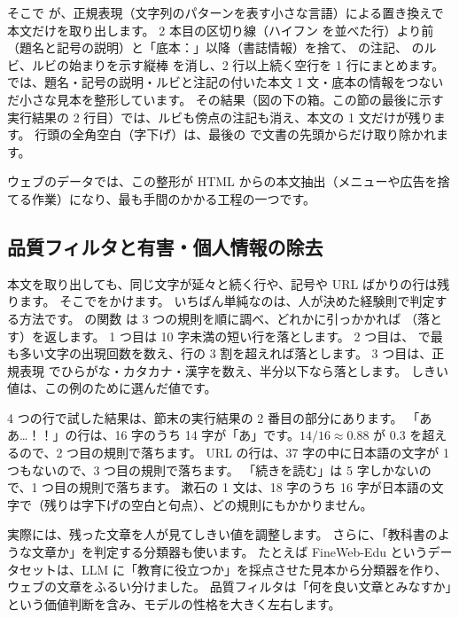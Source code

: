 そこで  が、正規表現（文字列のパターンを表す小さな言語）による置き換えで本文だけを取り出します。
2 本目の区切り線（ハイフン \code{-} を並べた行）より前（題名と記号の説明）と「底本：」以降（書誌情報）を捨て、
 の注記、 のルビ、ルビの始まりを示す縦棒  を消し、2 行以上続く空行を 1 行にまとめます。
 では、題名・記号の説明・ルビと注記の付いた本文 1 文・底本の情報をつないだ小さな見本を整形しています。
その結果（図の下の箱。この節の最後に示す実行結果の 2 行目）では、ルビも傍点の注記も消え、本文の 1 文だけが残ります。
行頭の全角空白（字下げ）は、最後の  で文書の先頭からだけ取り除かれます。

ウェブのデータでは、この整形が HTML からの本文抽出（メニューや広告を捨てる作業）になり、最も手間のかかる工程の一つです。

\subsection{品質フィルタと有害・個人情報の除去}

本文を取り出しても、同じ文字が延々と続く行や、記号や URL ばかりの行は残ります。
そこでをかけます。
いちばん単純なのは、人が決めた経験則で判定する方法です。
の関数  は 3 つの規則を順に調べ、どれかに引っかかれば （落とす）を返します。
1 つ目は 10 字未満の短い行を落とします。
2 つ目は、 で最も多い文字の出現回数を数え、行の 3 割を超えれば落とします。
3 つ目は、正規表現 \code{[ぁ-んァ-ン一-龥]} でひらがな・カタカナ・漢字を数え、半分以下なら落とします。
しきい値は、この例のために選んだ値です。


4 つの行で試した結果は、節末の実行結果の 2 番目の部分にあります。
「ああ…！！」の行は、16 字のうち 14 字が「あ」です。$14/16\approx 0.88$ が 0.3 を超えるので、2 つ目の規則で落ちます。
URL の行は、37 字の中に日本語の文字が 1 つもないので、3 つ目の規則で落ちます。
「続きを読む」は 5 字しかないので、1 つ目の規則で落ちます。
漱石の 1 文は、18 字のうち 16 字が日本語の文字で（残りは字下げの空白と句点）、どの規則にもかかりません。

実際には、残った文章を人が見てしきい値を調整します。
さらに、「教科書のような文章か」を判定する分類器も使います。
たとえば FineWeb-Edu というデータセットは、LLM に「教育に役立つか」を採点させた見本から分類器を作り、ウェブの文章をふるい分けました\cite{penedo2024fineweb}。
品質フィルタは「何を良い文章とみなすか」という価値判断を含み、モデルの性格を大きく左右します。

